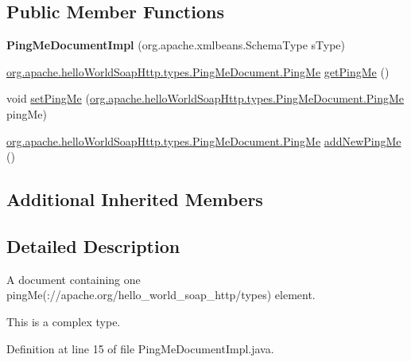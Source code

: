 \subsection*{Public Member Functions}
\begin{DoxyCompactItemize}
\item 
\hypertarget{classorg_1_1apache_1_1hello_world_soap_http_1_1types_1_1impl_1_1_ping_me_document_impl_abf5d998e00dab2ca0a9d2cf5ae1e6d17}{}{\bfseries Ping\+Me\+Document\+Impl} (org.\+apache.\+xmlbeans.\+Schema\+Type s\+Type)\label{classorg_1_1apache_1_1hello_world_soap_http_1_1types_1_1impl_1_1_ping_me_document_impl_abf5d998e00dab2ca0a9d2cf5ae1e6d17}

\item 
\hyperlink{interfaceorg_1_1apache_1_1hello_world_soap_http_1_1types_1_1_ping_me_document_1_1_ping_me}{org.\+apache.\+hello\+World\+Soap\+Http.\+types.\+Ping\+Me\+Document.\+Ping\+Me} \hyperlink{classorg_1_1apache_1_1hello_world_soap_http_1_1types_1_1impl_1_1_ping_me_document_impl_a30dafb7d98613520676563c431873505}{get\+Ping\+Me} ()
\item 
void \hyperlink{classorg_1_1apache_1_1hello_world_soap_http_1_1types_1_1impl_1_1_ping_me_document_impl_a985877005d06f88e67ff7bb6aefa37d4}{set\+Ping\+Me} (\hyperlink{interfaceorg_1_1apache_1_1hello_world_soap_http_1_1types_1_1_ping_me_document_1_1_ping_me}{org.\+apache.\+hello\+World\+Soap\+Http.\+types.\+Ping\+Me\+Document.\+Ping\+Me} ping\+Me)
\item 
\hyperlink{interfaceorg_1_1apache_1_1hello_world_soap_http_1_1types_1_1_ping_me_document_1_1_ping_me}{org.\+apache.\+hello\+World\+Soap\+Http.\+types.\+Ping\+Me\+Document.\+Ping\+Me} \hyperlink{classorg_1_1apache_1_1hello_world_soap_http_1_1types_1_1impl_1_1_ping_me_document_impl_adeb0706e2907eda0b62fbf6a7ded30f4}{add\+New\+Ping\+Me} ()
\end{DoxyCompactItemize}
\subsection*{Additional Inherited Members}


\subsection{Detailed Description}
A document containing one ping\+Me(\+://apache.org/hello\+\_\+world\+\_\+soap\+\_\+http/types) element.

This is a complex type. 

Definition at line 15 of file Ping\+Me\+Document\+Impl.\+java.



